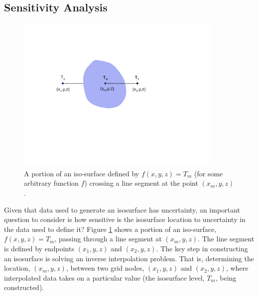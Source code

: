 \documentclass[11pt,twoside]{book}
\begin{document}
\clearpage

\subsection{Sensitivity Analysis}
\begin{figure}[bph]
\begin{center}
\includegraphics[height=3.0in]{FIGURES/linear_interpolationiso}
\end{center}
 \caption{A portion of an iso-surface defined by $f(x,y,z)=T_m$
 (for some arbitrary function $f$)  crossing a line segment at the point $(x_m,y,z)$.
  }
\label{figisointerpiso}%
\end{figure}

Given that data used to generate an isosurface has uncertainty, an
important question to consider is how sensitive is the isosurface
location to uncertainty in the data used to define it? Figure \ref{figisointerpiso}
shows a portion of an iso-surface, $f(x,y,z)=T_m$, passing through a line segment
at $(x_m,y,z)$. The line segment is defined by endpoints $(x_1,y,z)$ and $(x_2,y,z)$.
The key step in constructing an isosurface is solving an inverse interpolation problem.
That is, determining the location, $(x_m,y,z)$, between two grid nodes,
$(x_1,y,z)$ and $(x_2,y,z)$, where interpolated data takes on a particular value
(the isosurface level, $T_m$, being constructed).
\end{document}
